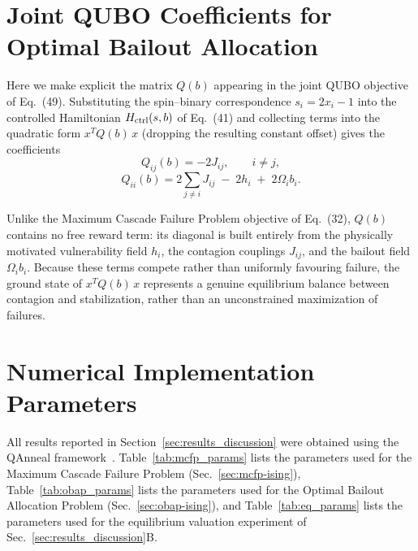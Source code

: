 \documentclass[aps,reprint,superscriptaddress,pra]{revtex4-2}
\begin{document}



\newpage


\appendix

\section{Joint QUBO Coefficients for Optimal Bailout Allocation}
\label{app:qb_derivation}

Here we make explicit the matrix $Q(b)$ appearing in the joint QUBO objective of
Eq.~(49). Substituting the spin--binary correspondence $s_i = 2x_i - 1$ into the
controlled Hamiltonian $H_{\rm ctrl}(s,b)$ of Eq.~(41) and collecting terms into the
quadratic form $x^{T}Q(b)\,x$ (dropping the resulting constant offset) gives the
coefficients
\begin{equation}
Q_{ij}(b) = -2J_{ij}, \qquad i \neq j,
\label{eq:qb_offdiag}
\end{equation}
\begin{equation}
Q_{ii}(b) = 2\sum_{j\neq i} J_{ij} \;-\; 2h_i \;+\; 2\Omega_i b_i.
\label{eq:qb_diag}
\end{equation}

Unlike the Maximum Cascade Failure Problem objective of Eq.~(32), $Q(b)$ contains no
free reward term: its diagonal is built entirely from the physically motivated
vulnerability field $h_i$, the contagion couplings $J_{ij}$, and the bailout field
$\Omega_i b_i$. Because these terms compete rather than uniformly favouring failure,
the ground state of $x^{T}Q(b)\,x$ represents a genuine equilibrium balance between
contagion and stabilization, rather than an unconstrained maximization of failures.

\section{Numerical Implementation Parameters}
\label{app:parameters}

All results reported in Section~\ref{sec:results_discussion} were obtained using the
QAnneal framework~\cite{qanneal2026}. Table~\ref{tab:mcfp_params} lists the parameters
used for the Maximum Cascade Failure Problem (Sec.~\ref{sec:mcfp-ising}),
Table~\ref{tab:obap_params} lists the parameters used for the Optimal Bailout
Allocation Problem (Sec.~\ref{sec:obap-ising}), and Table~\ref{tab:eq_params} lists the
parameters used for the equilibrium valuation experiment of
Sec.~\ref{sec:results_discussion}B.
\end{document}
